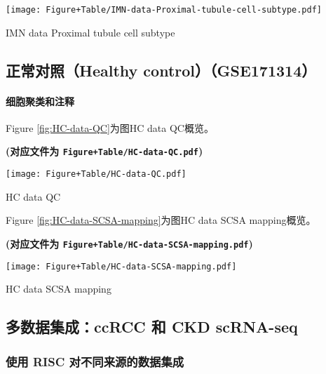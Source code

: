 \documentclass[
]{article}
\begin{document}
\def\@captype{figure}
\begin{center}
\texttt{[image: Figure+Table/IMN-data-Proximal-tubule-cell-subtype.pdf]}
\caption{IMN data Proximal tubule cell subtype}\label{fig:IMN-data-Proximal-tubule-cell-subtype}
\end{center}

\hypertarget{ux6b63ux5e38ux5bf9ux7167healthy-controlgse171314}{%
\subsection{正常对照（Healthy control）（GSE171314）}\label{ux6b63ux5e38ux5bf9ux7167healthy-controlgse171314}}

\hypertarget{ux7ec6ux80deux805aux7c7bux548cux6ce8ux91ca-4}{%
\paragraph{细胞聚类和注释}\label{ux7ec6ux80deux805aux7c7bux548cux6ce8ux91ca-4}}

Figure \ref{fig:HC-data-QC}为图HC data QC概览。

\textbf{(对应文件为 \texttt{Figure+Table/HC-data-QC.pdf})}

\def\@captype{figure}
\begin{center}
\texttt{[image: Figure+Table/HC-data-QC.pdf]}
\caption{HC data QC}\label{fig:HC-data-QC}
\end{center}

Figure \ref{fig:HC-data-SCSA-mapping}为图HC data SCSA mapping概览。

\textbf{(对应文件为 \texttt{Figure+Table/HC-data-SCSA-mapping.pdf})}

\def\@captype{figure}
\begin{center}
\texttt{[image: Figure+Table/HC-data-SCSA-mapping.pdf]}
\caption{HC data SCSA mapping}\label{fig:HC-data-SCSA-mapping}
\end{center}

\hypertarget{ux591aux6570ux636eux96c6ux6210ccrcc-ux548c-ckd-scrna-seq}{%
\subsection{多数据集成：ccRCC 和 CKD scRNA-seq}\label{ux591aux6570ux636eux96c6ux6210ccrcc-ux548c-ckd-scrna-seq}}

\hypertarget{ux4f7fux7528-risc-ux5bf9ux4e0dux540cux6765ux6e90ux7684ux6570ux636eux96c6ux6210}{%
\subsubsection{使用 RISC 对不同来源的数据集成}\label{ux4f7fux7528-risc-ux5bf9ux4e0dux540cux6765ux6e90ux7684ux6570ux636eux96c6ux6210}}
\end{document}
